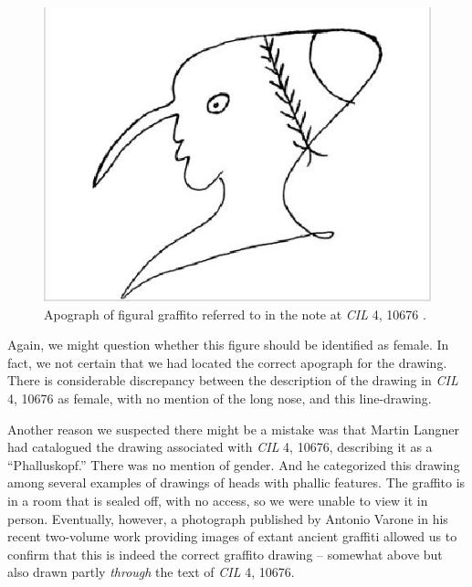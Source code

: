 \documentclass[amsthm,ebook]{saparticle}
\begin{document}
\begin{figure}[!bp]
\centering
 \includegraphics[width=\columnwidth]{EAGLE2016BenefielSypniewski-img007.jpg}
\caption{Apograph of figural graffito referred to in the note at \emph{CIL} 4, 10676 \citet[n. 309]{langner_antike_2001}.}
\label{fig:7}
\end{figure}


Again, we might question whether this figure should be identified as female. In fact, we not certain that we had located
the correct apograph for the drawing. There is considerable discrepancy between the description of the drawing in \emph{CIL}
4, 10676 as female, with no mention of the long nose, and this line-drawing. 

Another reason we suspected there might be a mistake was that Martin Langner had catalogued the drawing associated with
\emph{CIL} 4, 10676, describing it as a ``Phalluskopf.'' There was no mention of gender. And he categorized this drawing among
several examples of drawings of heads with phallic features. The graffito is in a room that is sealed off, with no
access, so we were unable to view it in person. Eventually, however, a photograph published by Antonio Varone in his
recent two-volume work providing images of extant ancient graffiti \citep[509]{varone_titulorum_2012} allowed us to confirm that this
is indeed the correct graffito drawing – somewhat above but also drawn partly \emph{through} the text of \emph{CIL} 4, 10676. 
\end{document}
